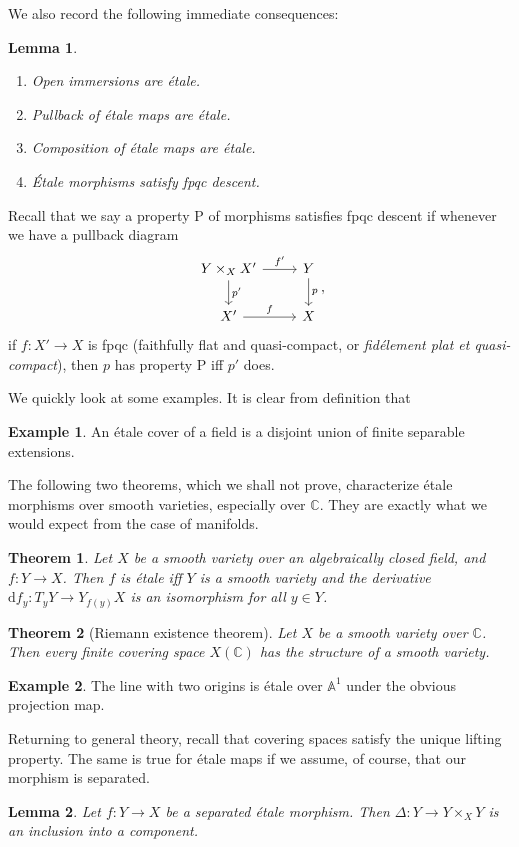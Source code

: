 \documentclass{shortart}
\newtheorem*{thm}{Theorem}
\newtheorem*{lemma}{Lemma}
\theoremstyle{definition}
\newtheorem*{eg}{Example}
\newcommand\A{\mathbb{A}}
\newcommand\C{\mathbb{C}}
\begin{document}
We also record the following immediate consequences:
\begin{lemma}\leavevmode
  \begin{enumerate}
    \item Open immersions are \'etale.
    \item Pullback of \'etale maps are \'etale.
    \item Composition of \'etale maps are \'etale.
    \item \'Etale morphisms satisfy fpqc descent.\fakeqed
  \end{enumerate}
\end{lemma}
Recall that we say a property P of morphisms satisfies fpqc descent if whenever we have a pullback diagram
\[
  \begin{tikzcd}
    Y \times_X X' \ar[d, "p'"] \ar[r, "f'"] & Y \ar[d, "p"]\\
    X' \ar[r, "f"] & X
  \end{tikzcd},
\]
if $f: X' \to X$ is fpqc (faithfully flat and quasi-compact, or \emph{fid\'element plat et quasi-compact}), then $p$ has property P iff $p'$ does.

We quickly look at some examples. It is clear from definition that
\begin{eg}
  An \'etale cover of a field is a disjoint union of finite separable extensions.\qedhere
\end{eg}

The following two theorems, which we shall not prove, characterize \'etale morphisms over smooth varieties, especially over $\C$. They are exactly what we would expect from the case of manifolds.
\begin{thm}
  Let $X$ be a smooth variety over an algebraically closed field, and $f: Y \to X$. Then $f$ is \'etale iff $Y$ is a smooth variety and the derivative $\mathrm{d} f_y: T_y Y \to Y_{f(y)}X$ is an isomorphism for all $y \in Y$.\fakeqed
\end{thm}
\begin{thm}[Riemann existence theorem]
  Let $X$ be a smooth variety over $\C$. Then every finite covering space $X(\C)$ has the structure of a smooth variety.\fakeqed
\end{thm}

\begin{eg}
  The line with two origins is \'etale over $\A^1$ under the obvious projection map.
\end{eg}

Returning to general theory, recall that covering spaces satisfy the unique lifting property. The same is true for \'etale maps if we assume, of course, that our morphism is separated.
\begin{lemma}
  Let $f: Y \to X$ be a separated \'etale morphism. Then $\Delta: Y \to Y \times_X Y$ is an inclusion into a component.
\end{lemma}
\end{document}
